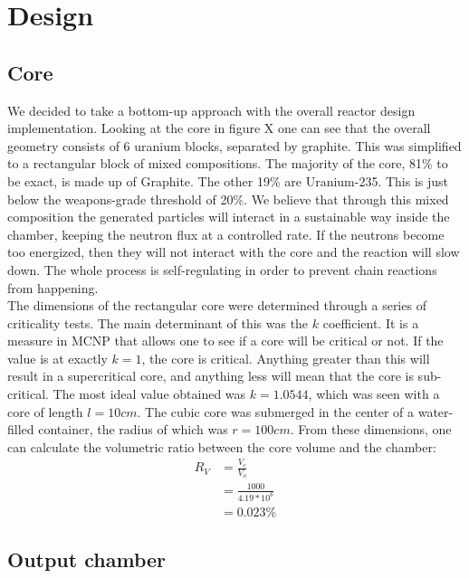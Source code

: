 \section*{Design}
\subsection*{Core}
\indent We decided to take a bottom-up approach with the overall reactor design implementation. Looking at the core in figure X
one can see that the overall geometry consists of 6 uranium blocks, separated by graphite. This was simplified to a rectangular block of mixed compositions. The majority of the core, 81\% to be exact, is made up of Graphite. The other 19\% are Uranium-235. This is just below the weapons-grade threshold of 20\%. We believe that through this mixed composition the generated particles will interact in a sustainable way inside the chamber, keeping the neutron flux at a controlled rate. If the neutrons become too energized, then they will not interact with the core and the reaction will slow down. The whole process is self-regulating in order to prevent chain reactions from happening.\\
\newline
\indent The dimensions of the rectangular core were determined through a series of criticality tests. The main determinant of this was the $k$ coefficient. It is a measure in MCNP that allows one to see if a core will be critical or not. If the value is at exactly $k=1$, the core is critical. Anything greater than this will result in a supercritical core, and anything less will mean that the core is sub-critical. The most ideal value obtained was $k=1.0544$, which was seen with a core of length $l=10cm$. The cubic core was submerged in the center of a water-filled container, the radius of which was $r=100cm$. From these dimensions, one can calculate the volumetric ratio between the core volume and the chamber:
\begin{align*}
R_{V} &= \frac{V_c}{V_o}\\
&= \frac{1000}{4.19*10^6}\\
&= 0.023\%
\end{align*}
\subsection*{Output chamber}